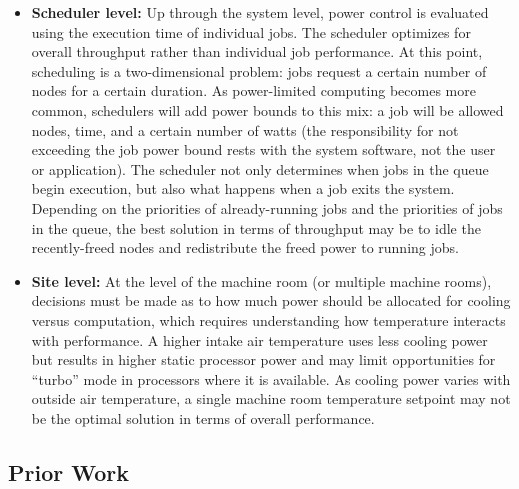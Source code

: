 \begin{itemize}
\item \textbf{Scheduler level:} Up through the system level, power control is evaluated
using the execution time of individual jobs. The scheduler optimizes for overall throughput
rather than individual job performance. At this point, scheduling is a two-dimensional 
problem: jobs request a certain number of nodes for a certain duration. As power-limited
computing becomes more common, schedulers will add power bounds to this mix: a job will
be allowed nodes, time, and a certain number of watts (the responsibility for not exceeding
the job power bound rests with the system software, not the user or application). The 
scheduler not only determines when jobs in the queue begin execution, but also what happens
when a job exits the system. Depending on the priorities of already-running jobs and the
priorities of jobs in the queue, the best solution in terms of throughput may be to idle
the recently-freed nodes and redistribute the freed power to running jobs.

\item \textbf{Site level:} At the level of the machine room (or multiple machine rooms),
decisions must be made as to how much power should be allocated for cooling versus computation, which requires understanding how temperature interacts with performance. A higher intake air temperature uses less cooling power but results in higher static processor power and may limit opportunities for ``turbo'' mode in processors where it is available. As cooling power varies with outside air temperature, a single machine room temperature setpoint may not be the optimal solution in terms of overall performance. 
\end{itemize}



\subsection{Prior Work}
\label{sub:priorwork}


